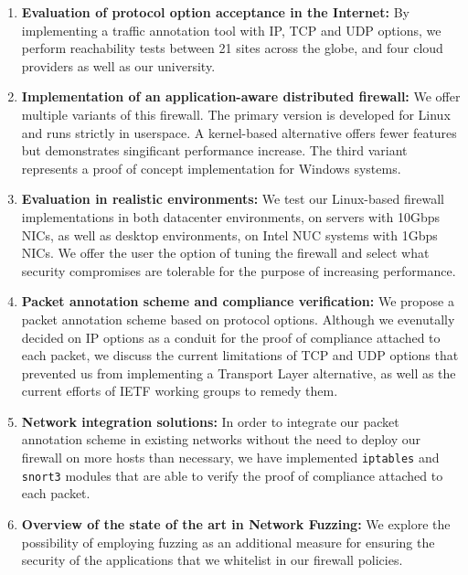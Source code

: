 \begin{enumerate}
    \item \textbf{Evaluation of protocol option acceptance in the Internet:}
          By implementing a traffic annotation tool with IP, TCP and UDP options,
          we perform reachability tests between 21 sites across the globe, and
          four cloud providers as well as our university.
    \item \textbf{Implementation of an application-aware distributed firewall:}
          We offer multiple variants of this firewall. The primary version is
          developed for Linux and runs strictly in userspace. A kernel-based
          alternative offers fewer features but demonstrates singificant
          performance increase. The third variant represents a proof of concept
          implementation for Windows systems.
    \item \textbf{Evaluation in realistic environments:} We test our Linux-based
          firewall implementations in both datacenter environments, on servers
          with 10Gbps NICs, as well as desktop environments, on Intel NUC
          systems with 1Gbps NICs. We offer the user the option of tuning the
          firewall and select what security compromises are tolerable for the
          purpose of increasing performance.
    \item \textbf{Packet annotation scheme and compliance verification:} We
          propose a packet annotation scheme based on protocol options. Although
          we evenutally decided on IP options as a conduit for the proof of
          compliance attached to each packet, we discuss the current limitations
          of TCP and UDP options that prevented us from implementing a Transport
          Layer alternative, as well as the current efforts of IETF working
          groups to remedy them.
    \item \textbf{Network integration solutions:} In order to integrate our
          packet annotation scheme in existing networks without the need to
          deploy our firewall on more hosts than necessary, we have implemented
          \texttt{iptables} and \texttt{snort3} modules that are able to
          verify the proof of compliance attached to each packet.
    \item \textbf{Overview of the state of the art in Network Fuzzing:}
          We explore the possibility of employing fuzzing as an additional
          measure for ensuring the security of the applications that we
          whitelist in our firewall policies.
\end{enumerate}

